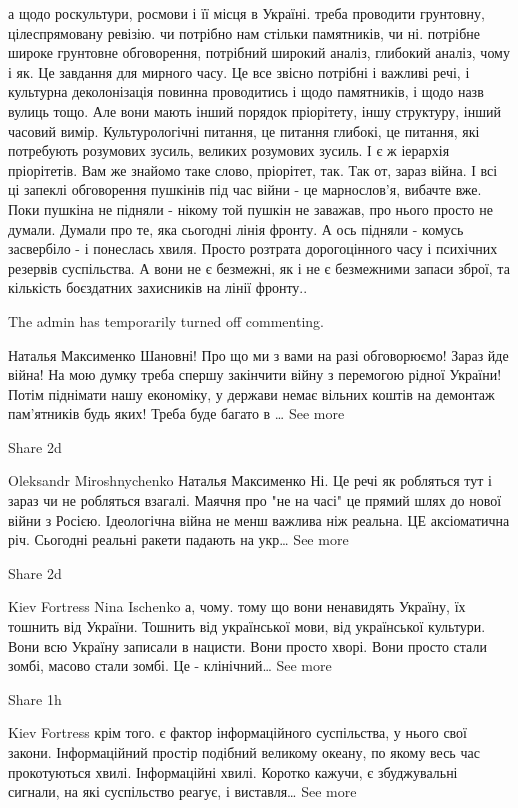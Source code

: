 а щодо роскультури, росмови і її місця в Україні. треба проводити грунтовну,
цілеспрямовану ревізію. чи потрібно нам стільки памятників, чи ні. потрібне
широке грунтовне обговорення, потрібний широкий аналіз, глибокий аналіз, чому і
як. Це завдання для мирного часу. Це все звісно потрібні і важливі речі, і
культурна деколонізація повинна проводитись і щодо памятників, і щодо назв
вулиць тощо. Але вони мають інший порядок пріорітету, іншу структуру, інший
часовий вимір. Культурологічні питання, це питання глибокі, це питання, які
потребують розумових зусиль, великих розумових зусиль. І є ж іерархія
пріорітетів. Вам же знайомо таке слово, пріорітет, так. Так от, зараз війна. І
всі ці запеклі обговорення пушкінів під час війни - це марнослов'я, вибачте
вже. Поки пушкіна не підняли - нікому той пушкін не заважав, про нього просто
не думали. Думали про те, яка сьогодні лінія фронту. А ось підняли - комусь
засвербіло - і понеслась хвиля. Просто розтрата дорогоцінного часу і психічних
резервів суспільства. А вони не є безмежні, як і не є безмежними запаси зброї,
та кількість боєздатних захисників на лінії фронту..

The admin has temporarily turned off commenting.

Наталья Максименко
Шановні! Про що ми з вами на разі обговорюємо! Зараз йде війна! На мою думку треба спершу закінчити війну з перемогою рідної України! Потім піднімати нашу економіку, у держави немає вільних коштів на демонтаж пам'ятників будь яких! Треба буде багато в … See more

    Share
    2d

Oleksandr Miroshnychenko
Наталья Максименко Ні. Це речі як робляться тут і зараз чи не робляться взагалі. Маячня про "не на часі" це прямий шлях до нової війни з Росією. Ідеологічна війна не менш важлива ніж реальна. ЦЕ аксіоматична річ. Сьогодні реальні ракети падають на укр… See more

    Share
    2d

Kiev Fortress
Nina Ischenko а, чому. тому що вони ненавидять Україну, їх тошнить від України. Тошнить від української мови, від української культури. Вони всю Україну записали в нацисти. Вони просто хворі. Вони просто стали зомбі, масово стали зомбі. Це - клінічний… See more

    Share
    1h

Kiev Fortress
крім того. є фактор інформаційного суспільства, у нього свої закони. Інформаційний простір подібний великому океану, по якому весь час прокотуються хвилі. Інформаційні хвилі. Коротко кажучи, є збуджувальні сигнали, на які суспільство реагує, і виставля… See more

